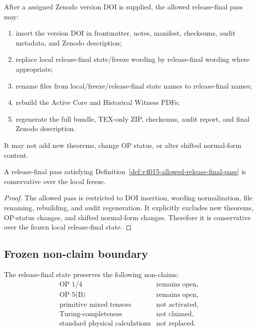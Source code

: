 \begin{definition}
\label{def:v4015-allowed-release-final-pass}
After a assigned Zenodo version DOI is supplied, the allowed release-final pass may:
\begin{enumerate}[leftmargin=*]
 \item insert the version DOI in frontmatter, notes, manifest, checksums, audit
 metadata, and Zenodo description;
 \item replace local release-final state/freeze wording by release-final wording where
 appropriate;
 \item rename files from local/freeze/release-final state names to release-final names;
 \item rebuild the Active Core and Historical Witness PDFs;
 \item regenerate the full bundle, TEX-only ZIP, checksums, audit report, and
 final Zenodo description.
\end{enumerate}
It may not add new theorems, change OP status, or alter shifted normal-form content.
\end{definition}

\begin{proposition}
\label{prop:v4015-doi-pass-conservative-under-allowed-boundary}
A release-final pass satisfying Definition~\ref{def:v4015-allowed-release-final-pass}
is conservative over the local  freeze.
\end{proposition}

\begin{proof}
The allowed pass is restricted to DOI insertion, wording normalization, file
renaming, rebuilding, and audit regeneration. It explicitly excludes new
theorems, OP-status changes, and shifted normal-form changes. Therefore it is
conservative over the frozen local release-final state.
\end{proof}

\subsection{Frozen non-claim boundary}
\label{subsec:v4015-frozen-non-claim-boundary}

\begin{definition}
\label{def:v4015-frozen-non-claim-boundary}
The release-final state preserves the following non-claims:
\[
\begin{array}{ll}
\text{OP~1/4} & \text{remains open},\\
\text{OP~5(B)} & \text{remains open},\\
\text{primitive mixed tensors} & \text{not activated},\\
\text{Turing-completeness} & \text{not claimed},\\
\text{standard physical calculations} & \text{not replaced}.
\end{array}
\]
\end{definition}

